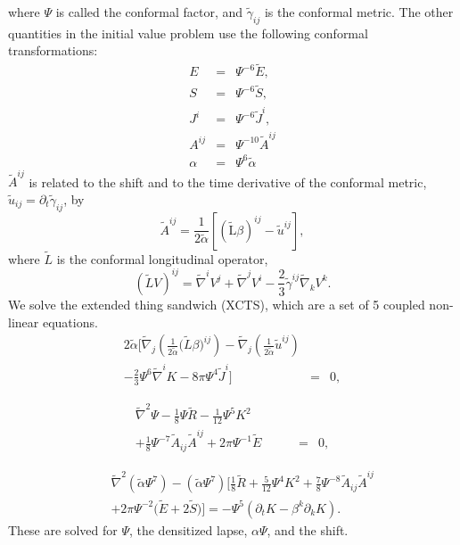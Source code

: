 where $\Psi$ is called the conformal factor, and $\tilde{\gamma}_{ij}$
is the conformal metric. The other quantities in the initial value
problem use the following conformal transformations:
\begin{eqnarray}
E &=& \Psi^{-6}\tilde{E}, \\
S &=& \Psi^{-6}\tilde{S}, \\
J^i &=& \Psi^{-6}\tilde{J}^i, \\
A^{ij} &=& \Psi^{-10}\tilde{A}^{ij} \\
\alpha &=& \Psi^{6}\tilde{\alpha} 
\end{eqnarray}
$\tilde{A}^{ij}$ is related to the shift and to the time derivative of
the conformal metric, $\tilde{u}_{ij}=\partial_t\tilde{\gamma}_{ij}$,
by
\begin{equation}
\tilde{A}^{ij} =
\frac{1}{2\tilde{\alpha}}\left[\left(\tilde{\mathrm{L}}\beta\right)^{ij}-\tilde{u}^{ij}\right],
\end{equation}
where $\tilde{L}$ is the conformal longitudinal operator,
\begin{equation}
\left(\tilde{L}V\right)^{ij}=\tilde{\nabla}^iV^j + \tilde{\nabla}^jV^i
- \frac{2}{3}\tilde{\gamma}^{ij}\tilde{\nabla}_kV^k.
\end{equation}
We solve the extended thing sandwich (XCTS), which are a set of 5
coupled non-linear equations.
\begin{eqnarray}
2\tilde{\alpha}\bigg[\tilde{\nabla}_j\left(\frac{1}{2\tilde{\alpha}}\big(\tilde{L}\beta\big)^{ij}\right)-\tilde{\nabla}_j\left(\frac{1}{2\tilde{\alpha}}\tilde{u}^{ij}\right) && \nonumber\\
\label{eq:XCTS-Shift}
-\frac{2}{3}\Psi^6\tilde{\nabla}^iK-8\pi\Psi^4\tilde{J}^i\bigg] &=&0,
\end{eqnarray}

\begin{eqnarray}
\tilde{\nabla}^2\Psi - \frac{1}{8}\Psi\tilde{R} -
\frac{1}{12}\Psi^5K^2  \qquad\quad && \nonumber \\
\label{eq:XCTS-ConformalFactor}
+\frac{1}{8}\Psi^{-7}\tilde{A}_{ij}\tilde{A}^{ij} +
2\pi\Psi^{-1}\tilde{E} &=& 0,
\end{eqnarray}

\begin{eqnarray}
&&\tilde{\nabla}^2\left(\tilde{\alpha}\Psi^7\right) -
\left(\tilde{\alpha}\Psi^7\right)\bigg[\frac{1}{8}\tilde{R}+\frac{5}{12}\Psi^4K^2+\frac{7}{8}\Psi^{-8}\tilde{A}_{ij}\tilde{A}^{ij}\nonumber \\
\label{eq:XCTS-Lapse}
&&+2\pi\Psi^{-2}\big(\tilde{E}+2\tilde{S}\big)\bigg]=-\Psi^5\left(\partial_{t}K
- \beta^{k}\partial_kK\right).
\end{eqnarray}
These are solved
for $\Psi$, the densitized lapse, $\alpha\Psi$, and the shift.


